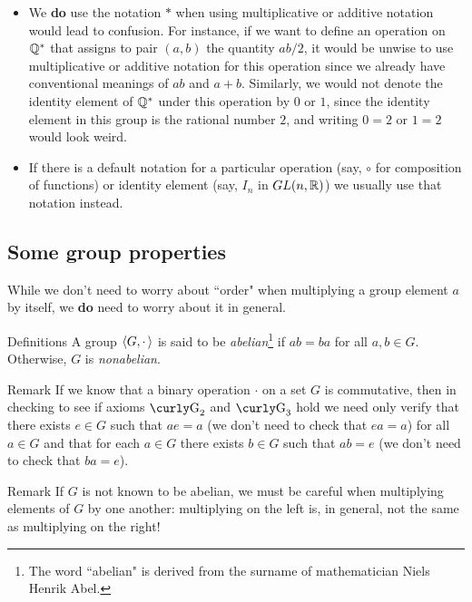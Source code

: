 \begin{itemize}
\item We \textbf{do} use the notation
$*$ when using multiplicative or additive notation would lead to
confusion. For instance, if we want to define an operation on
$\mathbb{Q}^*$ that assigns to pair $(a,b)$ the quantity $ab/2$, it would
be unwise to use multiplicative or additive notation for this
operation since we already have conventional meanings of $ab$ and
$a+b$. Similarly, we would not denote the identity element of
$\mathbb{Q}^*$ under this operation by $0$ or $1$, since the identity
element in this group is the rational number $2$, and writing $0=2$
or $1=2$ would look weird.

\item If there is a default notation for a particular
operation (say, $\circ$ for composition of functions) or identity
element (say, $I_n$ in $GL(n,\mathbb{R})$) we usually use that notation
instead.

\end{itemize}

\subsection{Some group properties}
\bigskip
While we don't need to worry about ``order" when multiplying a group element $a$ by itself, we \textbf{do} need to worry about it in general.

\bigskip
{}

\begin{df}{Definitions} A group $\langle G, \cdot\,\rangle$ is said to be \textit{abelian}\footnote{
The word ``abelian" is derived from the surname of
mathematician Niels Henrik Abel.} if $ab=ba$ for all $a,b\in
G$. Otherwise, $G$ is \textit{nonabelian}.\end{df}

\begin{df}{Remark} If we know that a binary operation $\cdot$
on a set $G$ is commutative, then in checking to see if axioms
$\G_2$ and $\G_3$ hold we need only verify that there exists
$e\in G$ such that $ae=a$ (we don't need to check that
$ea=a$) for all $a\in G$ and that for each $a\in G$ there
exists $b\in G$ such that $ab=e$ (we don't need to check that
$ba=e$).\end{df}

\begin{df}{Remark} If $G$ is not known to be abelian, we
must be careful when multiplying elements of $G$ by one
another: multiplying on the left is, in general, not the same
as multiplying on the right! \end{df}

